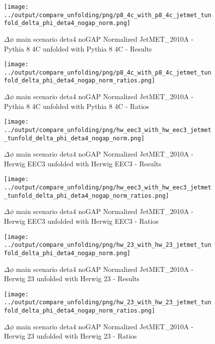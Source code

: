 \documentclass[11pt]{book}
\begin{document}
\begin{figure}[ht]
\centering
\texttt{[image: ../output/compare\_unfolding/png/p8\_4c\_with\_p8\_4c\_jetmet\_tunfold\_delta\_phi\_deta4\_nogap\_norm.png]}
\caption{$\Delta\phi$ main scenario deta4 noGAP Normalized JetMET\_2010A - Pythia 8 4C unfolded with Pythia 8 4C - Results}
\label{p8_p8_jetmet_tunfold_delta_phi_deta4_nogap_norm_a}
\end{figure}

\begin{figure}[ht]
\centering
\texttt{[image: ../output/compare\_unfolding/png/p8\_4c\_with\_p8\_4c\_jetmet\_tunfold\_delta\_phi\_deta4\_nogap\_norm\_ratios.png]}
\caption{$\Delta\phi$ main scenario deta4 noGAP Normalized JetMET\_2010A - Pythia 8 4C unfolded with Pythia 8 4C - Ratios}
\label{p8_p8_jetmet_tunfold_delta_phi_deta4_nogap_norm_b}
\end{figure}

\begin{figure}[ht]
\centering
\texttt{[image: ../output/compare\_unfolding/png/hw\_eec3\_with\_hw\_eec3\_jetmet\_tunfold\_delta\_phi\_deta4\_nogap\_norm.png]}
\caption{$\Delta\phi$ main scenario deta4 noGAP Normalized JetMET\_2010A - Herwig EEC3 unfolded with Herwig EEC3 - Results}
\label{hw_eec3_hw_eec3_jetmet_tunfold_delta_phi_deta4_nogap_norm_a}
\end{figure}

\begin{figure}[ht]
\centering
\texttt{[image: ../output/compare\_unfolding/png/hw\_eec3\_with\_hw\_eec3\_jetmet\_tunfold\_delta\_phi\_deta4\_nogap\_norm\_ratios.png]}
\caption{$\Delta\phi$ main scenario deta4 noGAP Normalized JetMET\_2010A - Herwig EEC3 unfolded with Herwig EEC3 - Ratios}
\label{hw_eec3_hw_eec3_jetmet_tunfold_delta_phi_deta4_nogap_norm_b}
\end{figure}

\begin{figure}[ht]
\centering
\texttt{[image: ../output/compare\_unfolding/png/hw\_23\_with\_hw\_23\_jetmet\_tunfold\_delta\_phi\_deta4\_nogap\_norm.png]}
\caption{$\Delta\phi$ main scenario deta4 noGAP Normalized JetMET\_2010A - Herwig 23 unfolded with Herwig 23 - Results}
\label{hw_23_hw_23_jetmet_tunfold_delta_phi_deta4_nogap_norm_a}
\end{figure}

\begin{figure}[ht]
\centering
\texttt{[image: ../output/compare\_unfolding/png/hw\_23\_with\_hw\_23\_jetmet\_tunfold\_delta\_phi\_deta4\_nogap\_norm\_ratios.png]}
\caption{$\Delta\phi$ main scenario deta4 noGAP Normalized JetMET\_2010A - Herwig 23 unfolded with Herwig 23 - Ratios}
\label{hw_23_hw_23_jetmet_tunfold_delta_phi_deta4_nogap_norm_b}
\end{figure}
\end{document}
